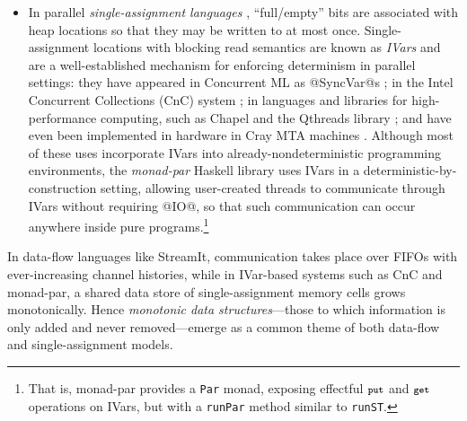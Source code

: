 \begin{itemize}
\item In parallel {\em single-assignment languages}
  \cite{Tesler-1968}, ``full/empty'' bits are associated with 
  heap locations so that they may be written to at most once.
  Single-assignment locations with blocking read semantics are known
  as \emph{IVars} \cite{IStructures} and are a well-established mechanism
  for enforcing determinism in parallel settings: they have appeared in
  Concurrent ML as @SyncVar@s \cite{reppy-cml-book}; 
  in the Intel Concurrent Collections (CnC) system \cite{CnC};
  in languages and libraries for
  high-performance computing, such as Chapel \cite{chapel} and the
  Qthreads library \cite{qthreads}; and have even been implemented in
  hardware in Cray MTA machines \cite{cray-mta}.  Although most of
  these uses incorporate IVars into already-nondeterministic
  programming environments, the {\em monad-par} Haskell library
  \cite{monad-par} uses IVars in a deterministic-by-construction
  setting, allowing user-created threads to communicate through IVars
  without requiring @IO@, 
  so that such communication can occur
  anywhere inside pure programs.\footnote{That is, monad-par provides
    a \lstinline|Par| monad, exposing effectful $\mbox{\footnotesize \texttt{put}}$ and $\mbox{\footnotesize \texttt{get}}$
    operations on IVars, but with a \lstinline|runPar| method similar to
    \lstinline|runST|.}  
\end{itemize}


\noindent In data-flow languages like StreamIt, communication takes place over FIFOs with
ever-increasing channel histories,
while in IVar-based systems such as
CnC and monad-par, a shared data store of single-assignment memory
cells grows monotonically.  Hence {\em monotonic data structures}---those
to which information is only added and never removed---emerge
as a common theme of both data-flow and single-assignment models.

